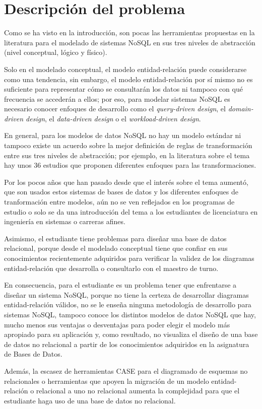 \section{Descripción del problema}
Como se ha visto en la introducción, son pocas las herramientas propuestas en la literatura para el modelado de sistemas NoSQL en sus tres niveles de abstracción (nivel conceptual, lógico y físico).


Solo en el modelado conceptual, el modelo entidad-relación puede considerarse como una tendencia, sin embargo, el modelo entidad-relación por sí mismo no es suficiente para representar cómo se consultarán los datos ni tampoco con qué frecuencia se accederán a ellos; por eso, para modelar sistemas NoSQL es necesario conocer enfoques de desarrollo como el \textit{query-driven design}, el \textit{domain-driven design}, el \textit{data-driven design} o el \textit{workload-driven design}.


En general, para los modelos de datos NoSQL no hay un modelo estándar ni tampoco existe un acuerdo sobre la mejor definición de reglas de transformación entre sus tres niveles de abstracción; por ejemplo, en la literatura sobre el tema hay unos 36 estudios que proponen diferentes enfoques para las transformaciones.


Por los pocos años que han pasado desde que el interés sobre el tema aumentó, que son usados estos sistemas de bases de datos y los diferentes enfoques de tranformación entre modelos, aún no se ven reflejados en los programas de estudio o solo se da una introducción del tema a los estudiantes de licenciatura en ingeniería en sistemas o carreras afines. 


Asimismo, el estudiante tiene problemas para diseñar una base de datos relacional, porque desde el modelado conceptual tiene que confiar en sus conocimientos recientemente adquiridos para verificar la validez de los diagramas entidad-relación que desarrolla o consultarlo con el maestro de turno.


En consecuencia, para el estudiante es un problema tener que enfrentarse a diseñar un sistema NoSQL, porque no tiene la certeza de desarrollar diagramas entidad-relación válidos, no se le enseña ninguna metodología de desarrollo para sistemas NoSQL, tampoco conoce los distintos modelos de datos NoSQL que hay, mucho menos sus ventajas o desventajas para poder elegir el modelo más apropiado para su aplicación y, como resultado, no visualiza el diseño de una base de datos no relacional a partir de los conocimientos adquiridos en la asignatura de Bases de Datos.


Además, la escasez de herramientas CASE para el diagramado de esquemas no relacionales o herramientas que apoyen la migración de un modelo entidad-relación o relacional a uno no relacional aumenta la complejidad para que el estudiante haga uso de una base de datos no relacional.
